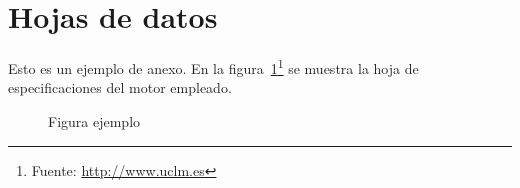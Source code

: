 \section{Hojas de datos}
\label{sec:hojas-datos}

Esto es un ejemplo de anexo. En la figura~\ref{fig:hoja-datos}\footnote{Fuente: \url{http://www.uclm.es}} se muestra la hoja de especificaciones del motor empleado.

\begin{figure}[ht!]
\centering
{}
\caption{Figura ejemplo}
\label{fig:hoja-datos}
\end{figure}